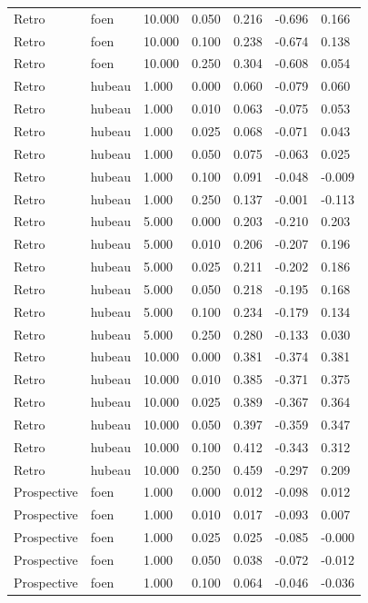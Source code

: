 {\begin{longtable}{p{}p{}p{}p{}p{}p{}p{}}
Retro & foen & 10.000 & 0.050 & 0.216 & -0.696 & 0.166 \\
Retro & foen & 10.000 & 0.100 & 0.238 & -0.674 & 0.138 \\
Retro & foen & 10.000 & 0.250 & 0.304 & -0.608 & 0.054 \\
Retro & hubeau & 1.000 & 0.000 & 0.060 & -0.079 & 0.060 \\
Retro & hubeau & 1.000 & 0.010 & 0.063 & -0.075 & 0.053 \\
Retro & hubeau & 1.000 & 0.025 & 0.068 & -0.071 & 0.043 \\
Retro & hubeau & 1.000 & 0.050 & 0.075 & -0.063 & 0.025 \\
Retro & hubeau & 1.000 & 0.100 & 0.091 & -0.048 & -0.009 \\
Retro & hubeau & 1.000 & 0.250 & 0.137 & -0.001 & -0.113 \\
Retro & hubeau & 5.000 & 0.000 & 0.203 & -0.210 & 0.203 \\
Retro & hubeau & 5.000 & 0.010 & 0.206 & -0.207 & 0.196 \\
Retro & hubeau & 5.000 & 0.025 & 0.211 & -0.202 & 0.186 \\
Retro & hubeau & 5.000 & 0.050 & 0.218 & -0.195 & 0.168 \\
Retro & hubeau & 5.000 & 0.100 & 0.234 & -0.179 & 0.134 \\
Retro & hubeau & 5.000 & 0.250 & 0.280 & -0.133 & 0.030 \\
Retro & hubeau & 10.000 & 0.000 & 0.381 & -0.374 & 0.381 \\
Retro & hubeau & 10.000 & 0.010 & 0.385 & -0.371 & 0.375 \\
Retro & hubeau & 10.000 & 0.025 & 0.389 & -0.367 & 0.364 \\
Retro & hubeau & 10.000 & 0.050 & 0.397 & -0.359 & 0.347 \\
Retro & hubeau & 10.000 & 0.100 & 0.412 & -0.343 & 0.312 \\
Retro & hubeau & 10.000 & 0.250 & 0.459 & -0.297 & 0.209 \\
Prospective & foen & 1.000 & 0.000 & 0.012 & -0.098 & 0.012 \\
Prospective & foen & 1.000 & 0.010 & 0.017 & -0.093 & 0.007 \\
Prospective & foen & 1.000 & 0.025 & 0.025 & -0.085 & -0.000 \\
Prospective & foen & 1.000 & 0.050 & 0.038 & -0.072 & -0.012 \\
Prospective & foen & 1.000 & 0.100 & 0.064 & -0.046 & -0.036 \\

\end{longtable}}

